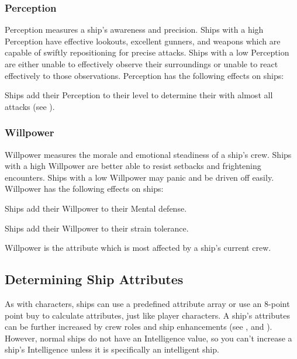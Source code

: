     \subsubsection{Perception}
      Perception measures a ship's awareness and precision.
      Ships with a high Perception have effective lookouts, excellent gunners, and weapons which are capable of swiftly repositioning for precise attacks.
      Ships with a low Perception are either unable to effectively observe their surroundings or unable to react effectively to those observations.
      Perception has the following effects on ships:
      \begin{raggeditemize}
        \item Ships add their Perception to their level to determine their  with almost all attacks (see ).
      \end{raggeditemize}

    \subsubsection{Willpower}
      Willpower measures the morale and emotional steadiness of a ship's crew.
      Ships with a high Willpower are better able to resist setbacks and frightening encounters.
      Ships with a low Willpower may panic and be driven off easily.
      Willpower has the following effects on ships:
      \begin{raggeditemize}
        \item Ships add their Willpower to their Mental defense.
        \item Ships add their Willpower to their strain tolerance.
      \end{raggeditemize}

      Willpower is the attribute which is most affected by a ship's current crew.

  \subsection{Determining Ship Attributes}
    As with characters, ships can use a predefined attribute array or use an 8-point point buy to calculate attributes, just like player characters.
    A ship's attributes can be further increased by crew roles and ship enhancements (see , and ).
    However, normal ships do not have an Intelligence value, so you can't increase a ship's Intelligence unless it is specifically an intelligent ship.

